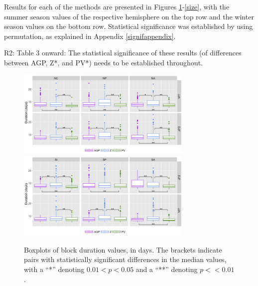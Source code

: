 \documentclass[smallextended]{svjour3}       %
\numberwithin{equation}{section}
\begin{document}
Results for each of the methods are presented in Figures \ref{duration}-\ref{size}, with the summer season values of the respective hemisphere on the top row and the winter season values on the bottom row. Statistical significance was established by using permutation, as explained in Appendix \ref{signifappendix}.

{\color{teal} R2: Table 3 onward: The statistical significance of these results (of differences between AGP, Z*, and PV*) needs to be established throughout.}



\begin{figure}
    \centering
    \includegraphics[width=0.75\textwidth]{fig_duration_NH.png}
    \includegraphics[width=0.75\textwidth]{fig_duration_SH.png}
    \caption{Boxplots of block duration values, in days. The brackets indicate pairs with statistically significant differences in the median values, with a ``*'' denoting $0.01<p<0.05$ and a ``**'' denoting $p<<0.01$.}
    \label{duration}
\end{figure}
\end{document}
